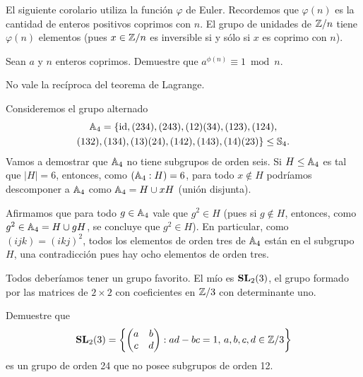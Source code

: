 El siguiente corolario utiliza la función $\varphi$ de Euler. Recordemos que
$\varphi(n)$ es la cantidad de enteros positivos coprimos con $n$. El grupo de
unidades de $\mathbb{Z}/n$ tiene $\varphi(n)$ elementos (pues $x\in\mathbb{Z}/n$ es inversible
si y sólo si $x$ es coprimo con $n$). 

\begin{exercise}
	Sean $a$ y $n$ enteros coprimos. Demuestre que 
	$a^{\phi(n)}\equiv1\bmod n$.
\end{exercise}

No vale la recíproca del teorema de Lagrange.

\begin{example}
Consideremos el grupo alternado 
\begin{multline*}
\mathbb{A}_4=\{\operatorname{id},(234),(243),(12)(34),(123),(124),\\(132),(134),(13)(24),(142),(143),(14)(23)\}\leq\mathbb{S}_4.	
\end{multline*}
Vamos a demostrar que $\mathbb{A}_4$ no tiene subgrupos de orden seis. Si $H\leq\mathbb{A}_4$ es tal que 
$|H|=6$, entonces, como $(\mathbb{A}_4:H)=6$, para todo $x\not\in H$ podríamos descomponer a $\mathbb{A}_4$ como $\mathbb{A}_4=H\cup xH$ (unión disjunta). 

Afirmamos que
para todo $g\in\mathbb{A}_4$ vale que $g^2\in H$ (pues si $g\not\in H$, entonces, como $g^2\in\mathbb{A}_4=H\cup gH$, se concluye que $g^2\in H$). En particular, como
$(ijk)=(ikj)^2$, 
todos los elementos de orden tres de $\mathbb{A}_4$ están en el subgrupo $H$, una contradicción pues hay ocho elementos de orden tres.   
\end{example}

Todos deberíamos tener un grupo favorito. El mío es $\mathbf{SL}_2(3)$,
el grupo formado por las matrices de $2\times2$ con coeficientes en $\mathbb{Z}/3$ 
con determinante uno.

\begin{exercise}
Demuestre que 
\[
\mathbf{SL}_2(3)=\left\{\begin{pmatrix}a&b\\c&d\end{pmatrix}:ad-bc=1,\,a,b,c,d\in\mathbb{Z}/3\right\}
\]
es un grupo de orden 24 que no posee subgrupos de orden 12.	
\end{exercise}


%


%
%


